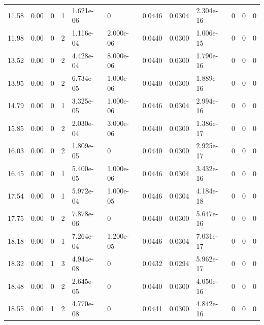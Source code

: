 \documentclass[preview]{standalone}
\begin{document}
{{\begin{tabular}{L{1.2cm}C{1.2cm} C{0.3cm}C{0.5cm} C{1.4cm}C{1.4cm} C{1.4cm}C{1.4cm} C{1.6cm}C{1.6cm} C{1.6cm}C{1.6cm}}
  11.58  &  0.00  & 0     &  1 &  1.621e-06  & 0  &  0.0446&   0.0304& 2.304e-16 & 0   &  0 & 0  \\ 
  11.98  &  0.00  & 0     &  2 &  1.116e-04  & 2.000e-06  &  0.0440&   0.0300& 1.006e-15 & 0   &  0 & 0  \\ 
  13.52  &  0.00  & 0     &  2 &  4.428e-04  & 8.000e-06  &  0.0440&   0.0300& 1.790e-16 & 0   &  0 & 0  \\ 
  13.95  &  0.00  & 0     &  2 &  6.734e-05  & 1.000e-06  &  0.0440&   0.0300& 1.889e-16 & 0   &  0 & 0  \\ 
  14.79  &  0.00  & 0     &  1 &  3.325e-05  & 1.000e-06  &  0.0446&   0.0304& 2.994e-16 & 0   &  0 & 0  \\ 
  15.85  &  0.00  & 0     &  2 &  2.030e-04  & 3.000e-06  &  0.0440&   0.0300& 1.386e-17 & 0   &  0 & 0  \\ 
  16.03  &  0.00  & 0     &  2 &  1.809e-05  & 0  &  0.0440&   0.0300& 2.925e-17 & 0   &  0 & 0  \\ 
  16.45  &  0.00  & 0     &  1 &  5.400e-05  & 1.000e-06  &  0.0446&   0.0304& 3.432e-16 & 0   &  0 & 0  \\ 
  17.54  &  0.00  & 0     &  1 &  5.972e-04  & 1.000e-05  &  0.0446&   0.0304& 4.184e-18 & 0   &  0 & 0  \\ 
  17.75  &  0.00  & 0     &  2 &  7.878e-06  & 0  &  0.0440&   0.0300& 5.647e-16 & 0   &  0 & 0  \\ 
  18.18  &  0.00  & 0     &  1 &  7.264e-04  & 1.200e-05  &  0.0446&   0.0304& 7.031e-17 & 0   &  0 & 0  \\ 
  18.32  &  0.00  & 1     &  3 &  4.944e-08  & 0  &  0.0432&   0.0294& 5.962e-17 & 0   &  0 & 0  \\ 
  18.48  &  0.00  & 0     &  2 &  2.645e-05  & 0  &  0.0440&   0.0300& 4.050e-16 & 0   &  0 & 0  \\ 
  18.55  &  0.00  & 1     &  2 &  4.770e-08  & 0  &  0.0441&   0.0300& 4.842e-16 & 0   &  0 & 0  \\ 
\hline 
\end{tabular} 

}}
\end{document}
